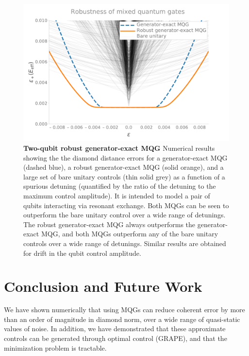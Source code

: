 \documentclass[aps,nofootinbib,pra,notitlepage,twocolumn]{revtex4-1}
\newcommand{\0}{\ensuremath{\mathbf{0}}}
\begin{document}
{\begin{figure}
  \centering
  \includegraphics[width=\columnwidth]{2q_robustness.pdf}
  \caption{\textbf{Two-qubit robust generator-exact MQG} Numerical results showing the the diamond distance errors for a generator-exact MQG (dashed blue), a robust generator-exact MQG (solid orange), and a large set of bare unitary controls (thin solid grey) as a function of a spurious detuning (quantified by the ratio of the detuning to the maximum control amplitude). It is intended to model a pair of qubits interacting via resonant exchange. Both MQGs can be seen to outperform the bare unitary control over a wide range of detunings. The robust generator-exact  MQG always outperforms the generator-exact MQG, and both MQGs outperform any of the bare unitary controls over a wide range of detunings. Similar results are obtained for drift in the qubit control amplitude.}
  \label{fig:2MQG}
\end{figure}








\section{Conclusion and Future Work}
We have shown numerically that using MQGs can reduce coherent error by more than an order of magnitude in diamond norm, over a wide range of quasi-static values of noise. In addition, we have demonstrated that these approximate controls can be generated through optimal control (GRAPE), and that the minimization problem is tractable.

}
\end{document}
